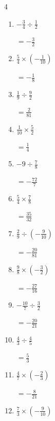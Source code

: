 \begin{multicols}{4}
\begin{enumerate}
        $\displaystyle =-\frac{3}{8}$

  \item $\displaystyle -\frac{3}{4}\div{}\frac{1}{2}$

        $\displaystyle =-\frac{3}{2}$

  \item $\displaystyle \frac{5}{4}\times{}\left(-\frac{1}{10}\right)$

        $\displaystyle =-\frac{1}{8}$

  \item $\displaystyle \frac{1}{9}\div{}\frac{9}{2}$

        $\displaystyle =\frac{2}{81}$

  \item $\displaystyle \frac{1}{10}\times{}\frac{5}{2}$

        $\displaystyle =\frac{1}{4}$

  \item $\displaystyle -9\div{}\frac{7}{8}$

        $\displaystyle =-\frac{72}{7}$

  \item $\displaystyle \frac{5}{4}\times{}\frac{7}{8}$

        $\displaystyle =\frac{35}{32}$

  \item $\displaystyle \frac{2}{9}\div{}\left(-\frac{9}{10}\right)$

        $\displaystyle =-\frac{20}{81}$

\columnbreak %

  \item $\displaystyle \frac{9}{8}\times{}\left(-\frac{3}{2}\right)$

        $\displaystyle =-\frac{27}{16}$

  \item $\displaystyle -\frac{10}{7}\div{}\frac{3}{2}$

        $\displaystyle =-\frac{20}{21}$

  \item $\displaystyle \frac{4}{3}\div{}\frac{4}{5}$

        $\displaystyle =\frac{5}{3}$

  \item $\displaystyle \frac{4}{7}\times{}\left(-\frac{2}{3}\right)$

        $\displaystyle =-\frac{8}{21}$

  \item $\displaystyle \frac{7}{3}\times{}\left(-\frac{9}{10}\right)$


\end{enumerate}
\end{multicols}
